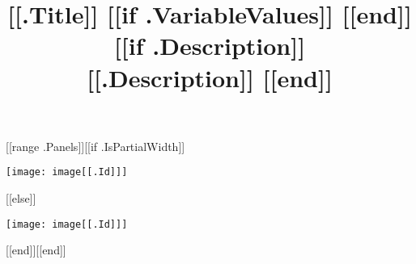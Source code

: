 \documentclass[landscape,titlepage]{article}
\begin{document}
\title{[[.Title]] [[if .VariableValues]] [[end]] [[if .Description]] \\ \small [[.Description]] [[end]]}
\date{}
\maketitle
\begin{center}
[[range .Panels]][[if .IsPartialWidth]]\begin{minipage}{[[.Width]]\textwidth}
\texttt{[image: image[[.Id]]]}
\end{minipage}
[[else]]\par
\vspace{0.5cm}
\texttt{[image: image[[.Id]]]}
\par
\vspace{0.5cm}
[[end]][[end]]
\end{center}
\end{document}
